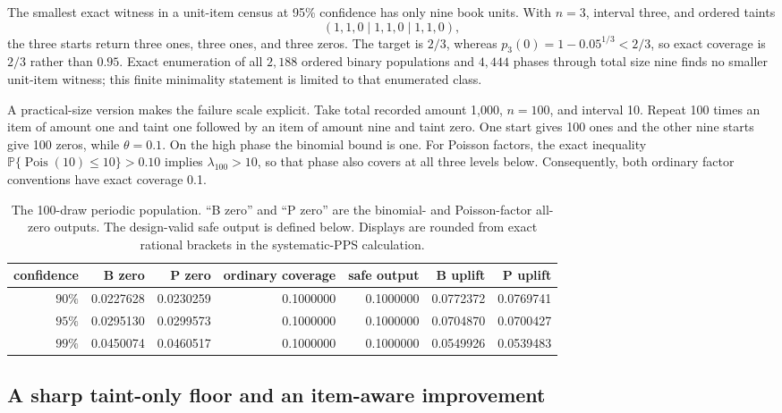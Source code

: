 \documentclass[11pt]{article}
\theoremstyle{definition}
\newcommand{\pr}{\mathbb{P}}
\begin{document}
The smallest exact witness in a unit-item census at 95\% confidence has only
nine book units. With $n=3$, interval three, and ordered taints
\[
 (1,1,0\mid1,1,0\mid1,1,0),
\]
the three starts return three ones, three ones, and three zeros. The target is
$2/3$, whereas $p_3(0)=1-0.05^{1/3}<2/3$, so exact coverage is $2/3$ rather
than $0.95$. Exact enumeration of all $2{,}188$ ordered binary populations
and $4{,}444$ phases through total size nine finds no smaller unit-item
witness; this finite minimality statement is limited to that enumerated class.

A practical-size version makes the failure scale explicit. Take total
recorded amount 1,000, $n=100$, and interval 10. Repeat 100 times an item of
amount one and taint one followed by an item of amount nine and taint zero.
One start gives 100 ones and the other nine starts give 100 zeros, while
$\theta=0.1$. On the high phase the binomial bound is one. For Poisson
factors, the exact inequality
$\pr\{\operatorname{Pois}(10)\le10\}>0.10$ implies
$\lambda_{100}>10$, so that phase also covers at all three levels below.
Consequently, both ordinary factor conventions have exact coverage 0.1.

\begin{table}[htbp]
\centering
\small
\begin{tabular}{@{}rrrrrrr@{}}
\toprule
confidence & B zero & P zero & ordinary coverage & safe output & B uplift & P uplift\\
\midrule
$90\%$ & 0.0227628 & 0.0230259 & 0.1000000 & 0.1000000 & 0.0772372 & 0.0769741\\
$95\%$ & 0.0295130 & 0.0299573 & 0.1000000 & 0.1000000 & 0.0704870 & 0.0700427\\
$99\%$ & 0.0450074 & 0.0460517 & 0.1000000 & 0.1000000 & 0.0549926 & 0.0539483\\
\bottomrule
\end{tabular}
\caption{The 100-draw periodic population. ``B zero'' and ``P zero'' are the
binomial- and Poisson-factor all-zero outputs. The design-valid safe output is
defined below. Displays are rounded from exact rational brackets in the
systematic-PPS calculation.}
\label{tab:systematicexample}
\end{table}

\subsection{A sharp taint-only floor and an item-aware improvement}
\end{document}
